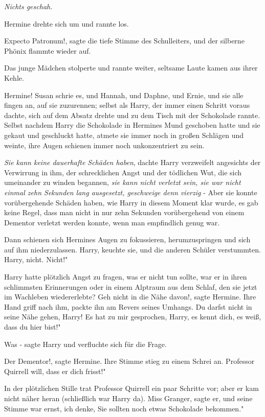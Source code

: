 \emph{Nichts geschah.}

Hermine drehte sich um und rannte los.

\glqq{}Expecto Patronum!\grqq{}, sagte die tiefe Stimme des Schulleiters, und der
silberne Phönix flammte wieder auf.

Das junge Mädchen stolperte und rannte weiter, seltsame Laute kamen aus ihrer
Kehle.

\glqq{}Hermine!\grqq{} Susan schrie es, und Hannah, und Daphne, und Ernie, und
sie alle fingen an, auf sie zuzurennen; selbst als Harry, der immer einen
Schritt voraus dachte, sich auf dem Absatz drehte und zu dem Tisch mit der
Schokolade rannte. Selbst nachdem Harry die Schokolade in Hermines Mund
geschoben hatte und sie gekaut und geschluckt hatte, atmete sie immer noch in
großen Schlägen und weinte, ihre Augen schienen immer noch unkonzentriert zu
sein.

\emph{Sie kann keine dauerhafte Schäden haben}, dachte Harry verzweifelt
angesichts der Verwirrung in ihm, der schrecklichen Angst und der tödlichen Wut,
die sich umeinander zu winden begannen,\emph{ sie kann nicht verletzt sein, sie
war nicht einmal zehn Sekunden lang ausgesetzt, geschweige denn vierzig} - Aber
sie konnte vorübergehende Schäden haben, wie Harry in diesem Moment klar wurde,
es gab keine Regel, dass man nicht in nur zehn Sekunden vorübergehend von einem
Dementor verletzt werden konnte, wenn man empfindlich genug war.

Dann schienen sich Hermines Augen zu fokussieren, herumzuspringen und sich auf
ihm niederzulassen. \glqq{}Harry\grqq{}, keuchte sie, und die anderen Schüler
verstummten. \glqq{}Harry, nicht. Nicht!"

Harry hatte plötzlich Angst zu fragen, was er nicht tun sollte, war er in ihren
schlimmsten Erinnerungen oder in einem Alptraum aus dem Schlaf, den sie jetzt im
Wachleben wiedererlebte? \glqq{}Geh nicht in die Nähe davon!\grqq{}, sagte
Hermine. Ihre Hand griff nach ihm, packte ihn am Revers seines Umhangs. \glqq{}Du
darfst nicht in seine Nähe gehen, Harry! Es hat zu mir gesprochen, Harry, es
kennt dich, es weiß, dass du hier bist!"

\glqq{}Was -\grqq{} sagte Harry und verfluchte sich für die Frage.

\glqq{}Der Dementor!\grqq{}, sagte Hermine. Ihre Stimme stieg zu einem Schrei an.
\glqq{}Professor Quirrell will, dass er dich frisst!"

In der plötzlichen Stille trat Professor Quirrell ein paar Schritte vor; aber er
kam nicht näher heran (schließlich war Harry da). \glqq{}Miss Granger\grqq{},
sagte er, und seine Stimme war ernst, \glqq{}ich denke, Sie sollten noch etwas
Schokolade bekommen."

